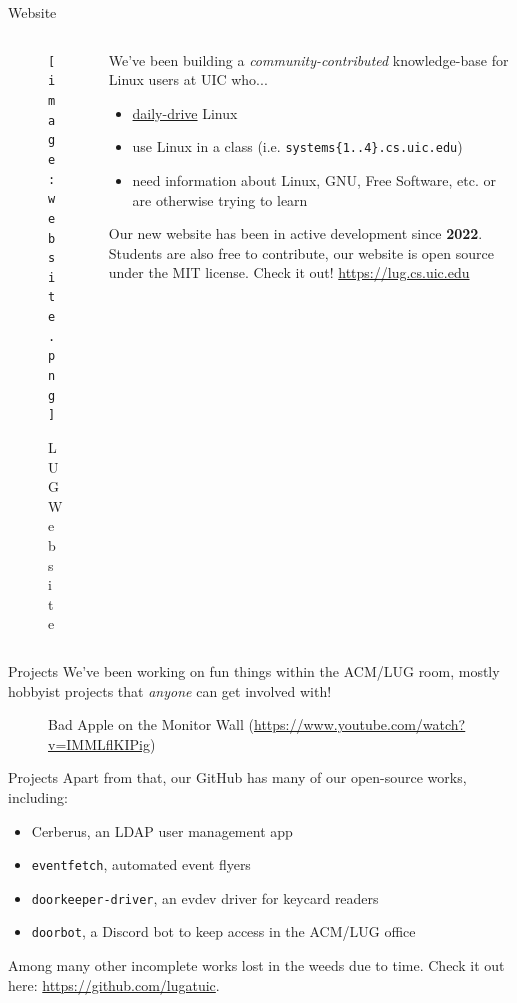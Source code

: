 \documentclass{beamer}
\begin{document}
\begin{frame}{Website}
	\begin{columns}
		\begin{column}{0.4\textwidth}
			\begin{figure}
				\centering
				\texttt{[image: website.png]}
				\caption{LUG Website}
			\end{figure}
		\end{column}
		\begin{column}{0.6\textwidth}
			We've been building a \textit{community-contributed}
			knowledge-base for Linux users at UIC who...
			\pause
			\begin{itemize}
				\item \underline{daily-drive} Linux
				      \pause
				\item use Linux in a class (i.e.
				      \texttt{systems\{1..4\}.cs.uic.edu})
				      \pause
				\item need information about Linux, GNU, Free
				      Software, etc. or are otherwise trying
				      to learn
				      \pause
			\end{itemize}
			Our new website has been in active development since
			\textbf{2022}. Students are also free to contribute,
			our website is open source under the MIT license. Check
			it out! \url{https://lug.cs.uic.edu}
		\end{column}
	\end{columns}
\end{frame}

\begin{frame}{Projects}
	We've been working on fun things within the ACM/LUG room, mostly
	hobbyist projects that \textit{anyone} can get involved with!
	\pause
	\begin{figure}
		\centering
		\caption{Bad Apple on the Monitor Wall
			(\url{https://www.youtube.com/watch?v=IMMLflKIPig})}
	\end{figure}
\end{frame}

\begin{frame}{Projects}
	Apart from that, our GitHub has many of our open-source works,
	including:
	\pause
	\begin{itemize}
		\item Cerberus, an LDAP user management app
		      \pause
		\item \texttt{eventfetch}, automated event flyers
		      \pause
		\item \texttt{doorkeeper-driver}, an evdev driver for keycard
		      readers
		      \pause
		\item \texttt{doorbot}, a Discord bot to keep access in the
		      ACM/LUG office
		      \pause
	\end{itemize}
	Among many other incomplete works lost in the weeds due to time. Check
	it out here: \url{https://github.com/lugatuic}.
\end{frame}
\end{document}
